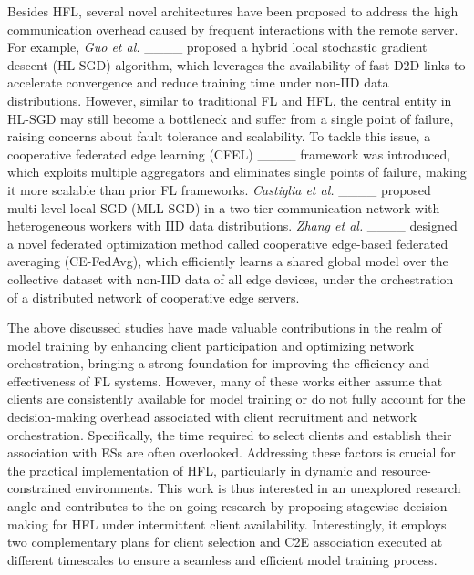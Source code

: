 Besides HFL, several novel architectures have been proposed to address the high communication overhead caused by frequent interactions with the remote server. For example, \textit{Guo et al.} ____ proposed a hybrid local stochastic gradient descent (HL-SGD) algorithm, which leverages the availability of fast D2D links to accelerate convergence and reduce training time under non-IID data distributions. However, similar to traditional FL and HFL, the central entity in HL-SGD may still become a bottleneck and suffer from a single point of failure, raising concerns about fault tolerance and scalability. To tackle this issue, a cooperative federated edge learning (CFEL) ____ framework was introduced, which exploits multiple aggregators and eliminates single points of failure, making it more scalable than prior FL frameworks. \textit{Castiglia et al.} ____ proposed multi-level local SGD (MLL-SGD) in a two-tier communication network with heterogeneous workers with IID data distributions. \textit{Zhang et al.} ____ designed a novel federated optimization method called cooperative edge-based federated averaging (CE-FedAvg), which efficiently learns a shared global model over the collective dataset with non-IID data of all edge devices, under the orchestration of a distributed network of cooperative edge servers.

The above discussed studies have made valuable contributions in the realm of model training by enhancing client participation and optimizing network orchestration, bringing a strong foundation for improving the efficiency and effectiveness of FL systems. However, many of these works either assume that clients are consistently available for model training or do not fully account for the decision-making overhead associated with client recruitment and network orchestration. Specifically, the time required to select clients and establish their association with ESs are often overlooked. Addressing these factors is crucial for the practical implementation of HFL, particularly in dynamic and resource-constrained environments. This work is thus interested in an unexplored research angle and contributes to the on-going research by proposing stagewise decision-making for HFL under intermittent client availability. Interestingly, it employs two complementary plans for client selection and C2E association executed at different timescales to ensure a seamless and efficient model training process.
